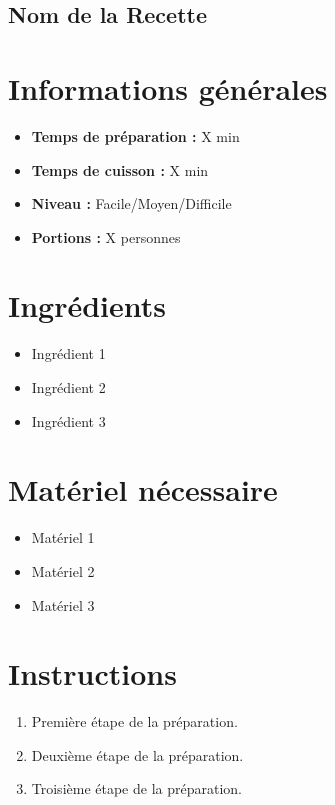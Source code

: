 \subsection{Nom de la Recette}

\section*{Informations générales}
\begin{itemize}
    \item \textbf{Temps de préparation :} X min
    \item \textbf{Temps de cuisson :} X min
    \item \textbf{Niveau :} Facile/Moyen/Difficile
    \item \textbf{Portions :} X personnes
\end{itemize}

\section*{Ingrédients}
\begin{itemize}
    \item Ingrédient 1
    \item Ingrédient 2
    \item Ingrédient 3
\end{itemize}

\section*{Matériel nécessaire}
\begin{itemize}
    \item Matériel 1
    \item Matériel 2
    \item Matériel 3
\end{itemize}

\section*{Instructions}
\begin{enumerate}
    \item Première étape de la préparation.
    \item Deuxième étape de la préparation.
    \item Troisième étape de la préparation.
\end{enumerate}

